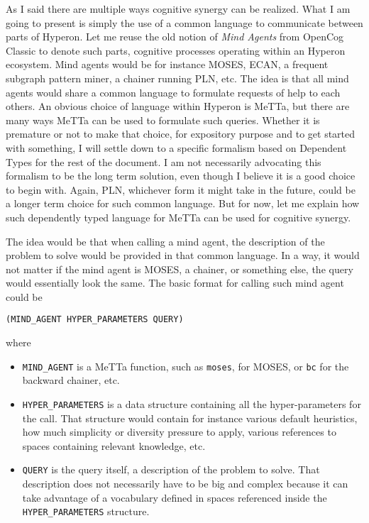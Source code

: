 \documentclass[]{report}
\begin{document}
As I said there are multiple ways cognitive synergy can be realized.
What I am going to present is simply the use of a common language to
communicate between parts of Hyperon.  Let me reuse the old notion of
\emph{Mind Agents} from OpenCog Classic to denote such parts,
cognitive processes operating within an Hyperon ecosystem.  Mind
agents would be for instance MOSES, ECAN, a frequent subgraph pattern
miner, a chainer running PLN, etc.  The idea is that all mind agents
would share a common language to formulate requests of help to each
others.  An obvious choice of language within Hyperon is MeTTa, but
there are many ways MeTTa can be used to formulate such queries.
Whether it is premature or not to make that choice, for expository
purpose and to get started with something, I will settle down to a
specific formalism based on Dependent Types for the rest of the
document.  I am not necessarily advocating this formalism to be the
long term solution, even though I believe it is a good choice to begin
with.  Again, PLN, whichever form it might take in the future, could
be a longer term choice for such common language.  But for now, let me
explain how such dependently typed language for MeTTa can be used for
cognitive synergy.

The idea would be that when calling a mind agent, the description of
the problem to solve would be provided in that common language.  In a
way, it would not matter if the mind agent is MOSES, a chainer, or
something else, the query would essentially look the same.  The basic
format for calling such mind agent could be

\begin{verbatim}
(MIND_AGENT HYPER_PARAMETERS QUERY)
\end{verbatim}
where
\begin{itemize}
\item \texttt{MIND_AGENT} is a MeTTa function, such as
  \texttt{moses}, for MOSES, or \texttt{bc}
  for the backward chainer, etc.
\item \texttt{HYPER_PARAMETERS} is a data structure
  containing all the hyper-parameters for the call.  That structure
  would contain for instance various default heuristics, how much
  simplicity or diversity pressure to apply, various references to
  spaces containing relevant knowledge, etc.
\item \texttt{QUERY} is the query itself, a description of
  the problem to solve.  That description does not necessarily have to
  be big and complex because it can take advantage of a vocabulary
  defined in spaces referenced inside the
  \texttt{HYPER_PARAMETERS} structure.
\end{itemize}
\end{document}
